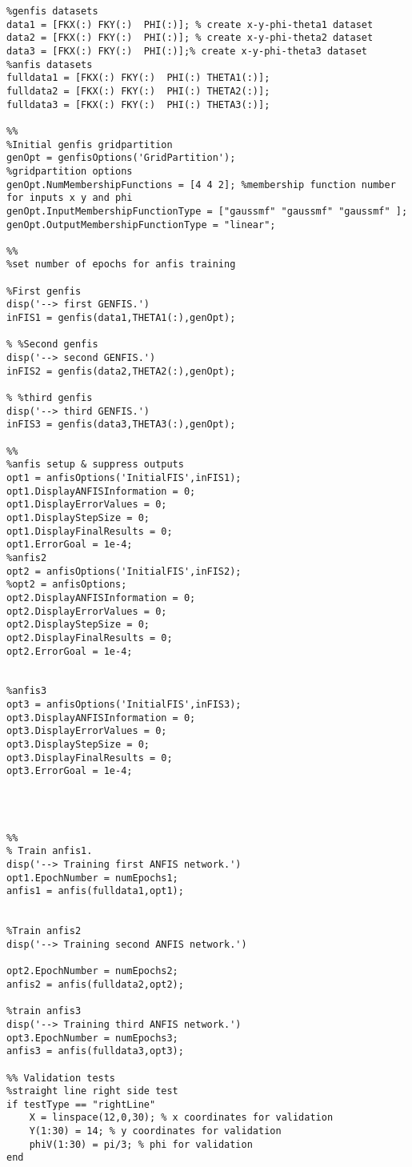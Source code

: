 \documentclass[a4paper,11pt]{article}
\begin{document}
\begin{appendices}
\begin{lstlisting}[style=Matlab-editor,basicstyle=\color{black}\ttfamily\tiny]
%%
%genfis datasets
data1 = [FKX(:) FKY(:)  PHI(:)]; % create x-y-phi-theta1 dataset
data2 = [FKX(:) FKY(:)  PHI(:)]; % create x-y-phi-theta2 dataset
data3 = [FKX(:) FKY(:)  PHI(:)];% create x-y-phi-theta3 dataset
%anfis datasets
fulldata1 = [FKX(:) FKY(:)  PHI(:) THETA1(:)];
fulldata2 = [FKX(:) FKY(:)  PHI(:) THETA2(:)];
fulldata3 = [FKX(:) FKY(:)  PHI(:) THETA3(:)];

%%
%Initial genfis gridpartition
genOpt = genfisOptions('GridPartition');
%gridpartition options
genOpt.NumMembershipFunctions = [4 4 2]; %membership function number for inputs x y and phi 
genOpt.InputMembershipFunctionType = ["gaussmf" "gaussmf" "gaussmf" ];
genOpt.OutputMembershipFunctionType = "linear";

%%
%set number of epochs for anfis training

%First genfis
disp('--> first GENFIS.')
inFIS1 = genfis(data1,THETA1(:),genOpt);

% %Second genfis
disp('--> second GENFIS.')
inFIS2 = genfis(data2,THETA2(:),genOpt);

% %third genfis 
disp('--> third GENFIS.')
inFIS3 = genfis(data3,THETA3(:),genOpt);

%%
%anfis setup & suppress outputs
opt1 = anfisOptions('InitialFIS',inFIS1);
opt1.DisplayANFISInformation = 0;
opt1.DisplayErrorValues = 0;
opt1.DisplayStepSize = 0;
opt1.DisplayFinalResults = 0;
opt1.ErrorGoal = 1e-4;
%anfis2
opt2 = anfisOptions('InitialFIS',inFIS2);
%opt2 = anfisOptions;
opt2.DisplayANFISInformation = 0;
opt2.DisplayErrorValues = 0;
opt2.DisplayStepSize = 0;
opt2.DisplayFinalResults = 0;
opt2.ErrorGoal = 1e-4; 


%anfis3
opt3 = anfisOptions('InitialFIS',inFIS3);
opt3.DisplayANFISInformation = 0;
opt3.DisplayErrorValues = 0;
opt3.DisplayStepSize = 0;
opt3.DisplayFinalResults = 0;
opt3.ErrorGoal = 1e-4; 




%%
% Train anfis1.
disp('--> Training first ANFIS network.')
opt1.EpochNumber = numEpochs1;
anfis1 = anfis(fulldata1,opt1);


%Train anfis2
disp('--> Training second ANFIS network.')

opt2.EpochNumber = numEpochs2;
anfis2 = anfis(fulldata2,opt2);

%train anfis3
disp('--> Training third ANFIS network.')
opt3.EpochNumber = numEpochs3;
anfis3 = anfis(fulldata3,opt3);

%% Validation tests 
%straight line right side test
if testType == "rightLine"
    X = linspace(12,0,30); % x coordinates for validation
    Y(1:30) = 14; % y coordinates for validation
    phiV(1:30) = pi/3; % phi for validation
end


\end{lstlisting}
\end{appendices}
\end{document}
